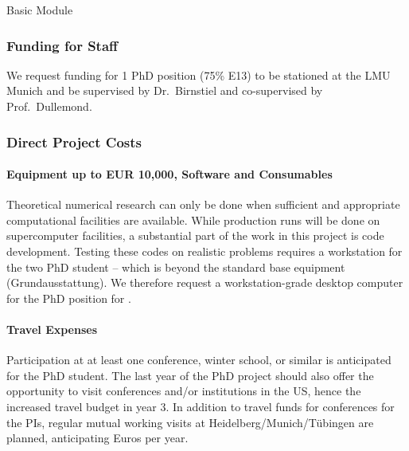 \documentclass[10pt,fleqn,twoside]{article}
\begin{document}
\begingroup
\renewcommand{\section}[2]{}%


\endgroup

\section{Requested modules/funds}


\subsection{Basic Module}

\subsubsection{Funding for Staff}


We request funding for 1 PhD position (75\% E13) to be stationed at the
LMU Munich and be supervised by Dr.\ Birnstiel and co-supervised by
Prof.\ Dullemond.

\subsubsection{Direct Project Costs}

\paragraph{Equipment up to EUR 10,000, Software and Consumables}

Theoretical numerical research can only be done when sufficient and
appropriate computational facilities are available. While production
runs will be done on supercomputer facilities, a substantial part of
the work in this project is code development. Testing these codes on
realistic problems requires a workstation for the two PhD
student -- which is beyond the standard base equipment
(Grundausstattung). We therefore request a workstation-grade desktop
computer for the PhD position for .

\paragraph{Travel Expenses}

Participation at at least one conference, winter school, or similar is
anticipated for the PhD student. The last year of the PhD project
should also offer the opportunity to visit conferences and/or
institutions in the US, hence the increased travel budget in year 3.
In addition to travel funds for conferences for the PIs, regular
mutual working visits at Heidelberg/Munich/Tübingen are planned,
anticipating  Euros per year.
\end{document}
